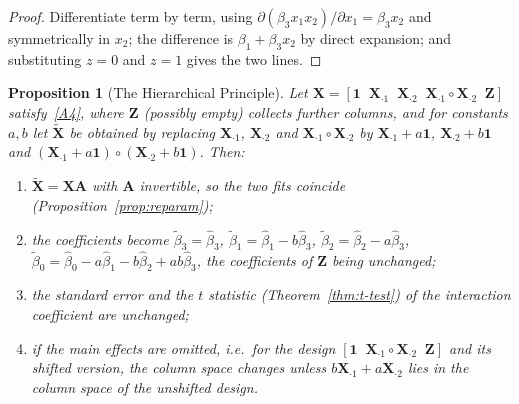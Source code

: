 \documentclass[14pt]{extarticle}
\theoremstyle{plain}
\newtheorem{proposition}[theorem]{Proposition}
\theoremstyle{definition}
\theoremstyle{remark}
\newcommand{\bX}{\mathbf{X}}
\newcommand{\bone}{\mathbf{1}}
\newcommand{\bA}{\mathbf{A}}
\begin{document}
\begin{proof}
Differentiate term by term, using $\partial(\beta_3x_1x_2)/\partial x_1 = \beta_3x_2$ and symmetrically in $x_2$; the difference is $\beta_1 + \beta_3x_2$ by direct expansion; and substituting $z = 0$ and $z = 1$ gives the two lines.
\end{proof}

\begin{proposition}[The Hierarchical Principle]\label{prop:hierarchy}
Let $\bX = [\bone \;\; \bX_{\cdot 1} \;\; \bX_{\cdot 2} \;\; \bX_{\cdot 1} \circ \bX_{\cdot 2} \;\; \mathbf{Z}]$ satisfy~\ref{A4}, where $\mathbf{Z}$ (possibly empty) collects further columns, and for constants $a, b$ let $\tilde{\bX}$ be obtained by replacing $\bX_{\cdot 1}$, $\bX_{\cdot 2}$ and $\bX_{\cdot 1} \circ \bX_{\cdot 2}$ by $\bX_{\cdot 1} + a\bone$, $\bX_{\cdot 2} + b\bone$ and $(\bX_{\cdot 1} + a\bone) \circ (\bX_{\cdot 2} + b\bone)$. Then:
\begin{enumerate}[label=\textup{(\roman*)}]
\item $\tilde{\bX} = \bX\bA$ with $\bA$ invertible, so the two fits coincide (Proposition~\ref{prop:reparam});
\item the coefficients become $\tilde\beta_3 = \hat\beta_3$, $\tilde\beta_1 = \hat\beta_1 - b\hat\beta_3$, $\tilde\beta_2 = \hat\beta_2 - a\hat\beta_3$, $\tilde\beta_0 = \hat\beta_0 - a\hat\beta_1 - b\hat\beta_2 + ab\hat\beta_3$, the coefficients of $\mathbf{Z}$ being unchanged;
\item the standard error and the $t$ statistic (Theorem~\ref{thm:t-test}) of the interaction coefficient are unchanged;
\item\label{hier:iv} if the main effects are omitted, i.e.\ for the design $[\bone \;\; \bX_{\cdot 1} \circ \bX_{\cdot 2} \;\; \mathbf{Z}]$ and its shifted version, the column space changes unless $b\bX_{\cdot 1} + a\bX_{\cdot 2}$ lies in the column space of the unshifted design.
\end{enumerate}
\end{proposition}
\end{document}
